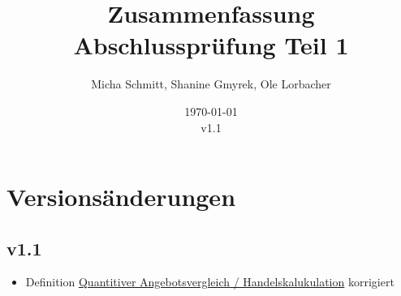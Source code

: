 \documentclass[10pt]{article}
\title{Zusammenfassung Abschlussprüfung Teil 1}
\author{Micha Schmitt, Shanine Gmyrek, Ole Lorbacher}
\date{\today \\ v1.1}
\begin{document}
\maketitle
\vspace{2cm}
\tableofcontents

\pagebreak
\setcounter{page}{1}
\setcounter{section}{-1}
\section{Versionsänderungen}
\subsection{v1.1}
\begin{itemize}
    \item Definition \hyperref[sec:Handelskalkulation]{Quantitiver Angebotsvergleich / Handelskalukulation} korrigiert
\end{itemize}




\pagebreak



\pagebreak



\pagebreak



\pagebreak



\pagebreak



\pagebreak


\end{document}

